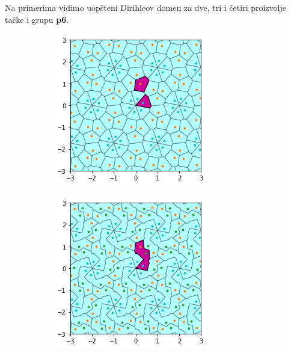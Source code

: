 \documentclass[11pt]{article}
\begin{document}
\begin{samepage}
Na primerima vidimo uop\v steni Dirihleov domen za dve, tri i \v cetiri proizvolje ta\v cke i grupu \textbf{p6}.

\begin{figure}[H]
  \begin{subfigure}[b]{0.3\textwidth}
    \includegraphics[width=\textwidth]{output_14_0.png}
    \label{fig:f4}
  \end{subfigure}
  \begin{subfigure}[b]{0.3\textwidth}
    \includegraphics[width=\textwidth]{output_15_0.png}

\end{subfigure}
\end{figure}
\end{samepage}
\end{document}
